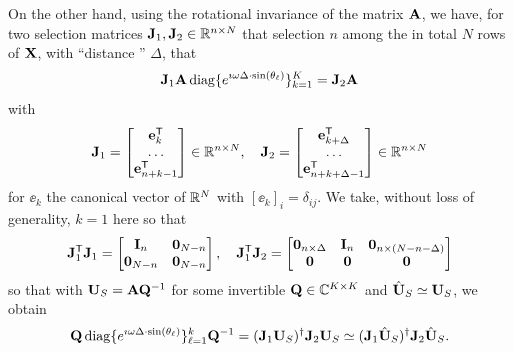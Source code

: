 \documentclass[11pt,a4paper]{article}
\begin{document}
On the other hand, using the rotational invariance of the matrix ${\mathbf{A}}$, we have, for two selection matrices ${\mathbf{J}}_1, {\mathbf{J}}_2 \in {\mathbb{R}}^{n \times N}$ that selection $n$ among the in total $N$ rows of ${\mathbf{X}}$, with ``distance '' $\Delta$, that
\begin{equation}\label{eq:ESPRIT1}
	{\mathbf{J}}_1 {\mathbf{A}} \operatorname{diag}\{ e^{\imath \omega \Delta \cdot \sin(\theta_\ell)} \}_{k=1}^K = {\mathbf{J}}_2 {\mathbf{A}} 
\end{equation}
with
\begin{equation}
	{\mathbf{J}}_1 = \begin{bmatrix} \mathbf{e}_k^{\sf T} \\ \ldots \\ \mathbf{e}_{n+k-1}^{\sf T} \end{bmatrix} \in {\mathbb{R}}^{n \times N}, \quad {\mathbf{J}}_2 = \begin{bmatrix} \mathbf{e}_{k+\Delta}^{\sf T} \\ \ldots \\ \mathbf{e}_{n+k+\Delta-1}^{\sf T} \end{bmatrix} \in {\mathbb{R}}^{n \times N}
\end{equation}
for $\ee_k$ the canonical vector of ${\mathbb{R}}^{N}$ with $[\ee_{k}]_{i} = \delta_{ij}$.
We take, without loss of generality, $k = 1$ here so that
\begin{equation}
	{\mathbf{J}}_1^{\sf T} {\mathbf{J}}_1 = \begin{bmatrix} \mathbf{I}_n & \mathbf{0}_{N-n} \\ \mathbf{0}_{N-n} & \mathbf{0}_{N-n} \end{bmatrix}, \quad {\mathbf{J}}_1^{\sf T} {\mathbf{J}}_2 = \begin{bmatrix} \mathbf{0}_{n \times \Delta} & \mathbf{I}_n & \mathbf{0}_{n \times (N-n-\Delta)} \\ \mathbf{0} & \mathbf{0} & \mathbf{0} \end{bmatrix}
\end{equation}
so that with ${\mathbf{U}}_S = {\mathbf{A}} {\mathbf{Q}}^{-1}$ for some invertible ${\mathbf{Q}} \in {\mathbb{C}}^{K \times K}$ and $\hat {{\mathbf{U}}}_S \simeq {\mathbf{U}}_S$, we obtain
\begin{equation}\label{eq:ESPRIT2}
		{\mathbf{Q}} \operatorname{diag}\{ e^{\imath \omega \Delta \cdot \sin(\theta_\ell)} \}_{\ell=1}^k {\mathbf{Q}}^{-1} = ({\mathbf{J}}_1 {\mathbf{U}}_S)^\dagger {\mathbf{J}}_2 {\mathbf{U}}_S \simeq ({\mathbf{J}}_1 \hat {{\mathbf{U}}}_S)^\dag {\mathbf{J}}_2 \hat {{\mathbf{U}}}_S.
\end{equation}
\end{document}
